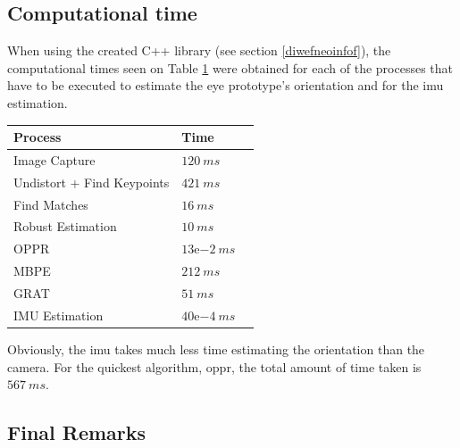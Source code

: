 \subsection{Computational time}

When using the created C++ library (see section \ref{diwefneoinfof}), the computational times seen on Table \ref{cha5:sec1:speed} were obtained for each of the processes that have to be executed to estimate the eye prototype's orientation and for the \acrshort{imu} estimation.

\begin{table}[ht]
	\centering
	\begin{tabular}{| l | l | l |}
		\hline
		Process & Time \\
		\hline
		Image Capture & $120 \ ms$  \\
		\hline
		Undistort + Find Keypoints &   $421 \ ms$ \\
		\hline
		Find Matches & $16 \ ms$ \\ 
		\hline
		Robust Estimation & $10 \ ms$ \\ 
		\hline
		OPPR & $13\mathrm{e}{-2} \ ms$ \\ 
		\hline
		MBPE & $212 \ ms$ \\ 
		\hline
		GRAT & $51 \ ms$ \\ 
		\hline
		IMU Estimation &  $40\mathrm{e}{-4} \ ms$ \\ 
		\hline
	\end{tabular}
	\label{cha5:sec1:speed}
\end{table}

Obviously, the \acrshort{imu} takes much less time estimating the orientation than the camera. For the quickest algorithm, \acrshort{oppr}, the total amount of time taken is $567 \ ms$. 

\subsection{Final Remarks}

